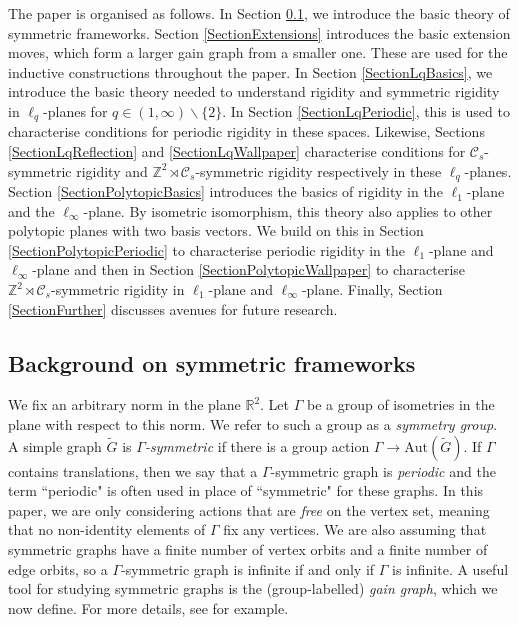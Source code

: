 \documentclass[reqno,a4paper,10pt]{article}
\theoremstyle{definition}
\theoremstyle{remark}
\numberwithin{equation}{section}
\numberwithin{figure}{section}
\numberwithin{table}{section}
\newcommand{\R}{\mathbb{R}}
\newcommand{\Z}{\mathbb{Z}}
\newcommand{\G}{\tilde{G}}
\begin{document}
   The paper is organised as follows. In Section \ref{SectionSymmetric}, we introduce the basic theory of symmetric frameworks. Section \ref{SectionExtensions} introduces the basic extension moves, which form a larger gain graph from a smaller one. These are used for the inductive constructions throughout the paper. In Section \ref{SectionLqBasics}, we introduce the basic theory needed to understand rigidity and symmetric rigidity in $\ell_q$-planes for $q\in(1,\infty)\backslash\{2\}$. In Section \ref{SectionLqPeriodic}, this is used to characterise conditions for periodic rigidity in these spaces. Likewise, Sections \ref{SectionLqReflection} and \ref{SectionLqWallpaper} characterise conditions for $\mathcal{C}_s$-symmetric rigidity and $\Z^2\rtimes\mathcal{C}_s$-symmetric rigidity respectively in these $\ell_q$-planes. Section \ref{SectionPolytopicBasics} introduces the basics of rigidity in the $\ell_1$-plane and the $\ell_\infty$-plane. By isometric isomorphism, this theory also applies to other polytopic planes with two basis vectors. We build on this in Section \ref{SectionPolytopicPeriodic} to characterise periodic rigidity in the $\ell_1$-plane and $\ell_\infty$-plane and then in Section \ref{SectionPolytopicWallpaper} to characterise $\Z^2\rtimes\mathcal{C}_s$-symmetric rigidity in $\ell_1$-plane and $\ell_\infty$-plane. Finally, Section \ref{SectionFurther} discusses avenues for future research.


\subsection{Background on symmetric frameworks}\label{SectionSymmetric}


    We fix an arbitrary norm in the plane $\R^2$. Let $\Gamma$ be a group of isometries in the plane with respect to this norm. We refer to such a group as a \emph{symmetry group}. A simple graph $\G$ is \emph{$\Gamma$-symmetric} if there is a group action $\Gamma\to\mathrm{Aut}(\G)$. If $\Gamma$ contains translations, then we say that a $\Gamma$-symmetric graph is \emph{periodic} and the term ``periodic" is often used in place of ``symmetric" for these graphs. In this paper, we are only considering actions that are \emph{free} on the vertex set, meaning that no non-identity elements of $\Gamma$ fix any vertices. We are also assuming that symmetric graphs have a finite number of vertex orbits and a finite number of edge orbits, so a $\Gamma$-symmetric graph is infinite if and only if $\Gamma$ is infinite. A useful tool for studying symmetric graphs is the (group-labelled) \emph{gain graph}, which we now define. For more details, see \cite{EGRES,Torus,Quotient} for example.
\end{document}
